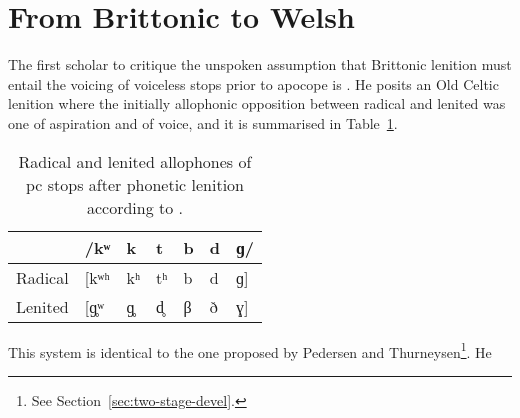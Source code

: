 \section{From Brittonic to Welsh}
\label{sec:from-brittonic-welsh}
The first scholar to critique the unspoken assumption that Brittonic lenition must entail the voicing of voiceless stops prior to apocope is \textcite{koch_*cothairche_1990}. He posits an Old Celtic lenition where the initially allophonic opposition between radical and lenited was one of aspiration and of voice, and it is summarised in Table~\ref{tab:kochstops}.

\begin{table}[h]
  \centering
  \begin{tabular}{lllllll}
    \toprule
            &/kʷ & k & t & b & d & ɡ/ \\\midrule
    Radical &[kʷʰ& kʰ& tʰ& b & d & ɡ] \\ 
    Lenited &[ɡ̥ʷ & ɡ̥ & d̥ & β & ð & ɣ]\\
    \bottomrule
  \end{tabular}
\caption{Radical and lenited allophones of \gls{pc} stops after phonetic lenition according to \textcite[§~30]{koch_*cothairche_1990}.}
\label{tab:kochstops}
\end{table}

This system is identical to the one proposed by Pedersen and Thurneysen\footnote{See Section~\ref{sec:two-stage-devel}.}. He 

